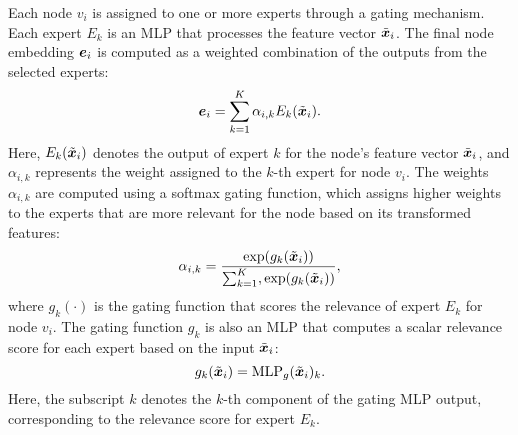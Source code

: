 
Each node \( v_i \) is assigned to one or more experts through a gating mechanism. Each expert \( E_k \) is an MLP that processes the feature vector \( \tilde{{\bm{x}}}_i \). The final node embedding \( {\bm{e}}_i \) is computed as a weighted combination of the outputs from the selected experts:
\begin{equation}
    {\bm{e}}_i = \sum_{k=1}^{K} \alpha_{i,k} E_k(\tilde{{\bm{x}}}_i).
\end{equation}
Here, \( E_k(\tilde{{\bm{x}}}_i) \) denotes the output of expert \( k \) for the node's feature vector \( \tilde{{\bm{x}}}_i \), and \( \alpha_{i,k} \) represents the weight assigned to the \( k \)-th expert for node \( v_i \). The weights \( \alpha_{i,k} \) are computed using a softmax gating function, which assigns higher weights to the experts that are more relevant for the node based on its transformed features:
\begin{equation}
    \alpha_{i,k} = \frac{\exp(g_k(\tilde{{\bm{x}}}_i))}{\sum_{k=1}^{K}, \exp(g_k(\tilde{{\bm{x}}}_i))}, 
\end{equation}
where \( g_k(\cdot) \) is the gating function that scores the relevance of expert \( E_k \) for node \( v_i \). The gating function \( g_k \) is also an MLP that computes a scalar relevance score for each expert based on the input \( \tilde{{\bm{x}}}_i \):
\begin{equation}
    g_k(\tilde{{\bm{x}}}_i) = \text{MLP}_g(\tilde{{\bm{x}}}_i)_k.
\end{equation}
Here, the subscript \( k \) denotes the \( k \)-th component of the gating MLP output, corresponding to the relevance score for expert \( E_k \).


